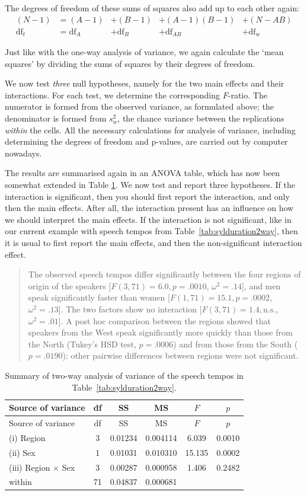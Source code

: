 \documentclass[
]{book}
\begin{document}
The degrees of freedom of these sums of squares also add up to each other
again:
\begin{align}
  \label{eq:dftotal2}
    { (N-1) } &= (A-1) &+ (B-1) &+ (A-1)(B-1) &+ (N-AB) \\
    \textrm{df}_t &= \textrm{df}_A &+ \textrm{df}_B &+ \textrm{df}_{AB} &+ \textrm{df}_w
\end{align}

Just like with the one-way analysis of variance, we again calculate the
`mean squares' by dividing the sums of squares by their degrees of freedom.

We now test \emph{three} null hypotheses, namely for the two main effects and their
interactions. For each test, we determine the corresponding
\(F\)-ratio. The numerator is formed from the observed variance,
as formulated above; the denominator is formed from \(s^2_w\), the
chance variance between the replications \emph{within} the cells. All
the necessary calculations for analysis of variance, including determining
the degrees of freedom and p-values, are carried out by computer
nowadays.

The results are summarised again in an ANOVA table, which has now been somewhat
extended in Table \ref{tab:syldur2way-anova}. We now test and report three
hypotheses. If the interaction is significant, then you should first report
the interaction, and only then the main effects. After all, the interaction present
has an influence on how we should interpret the main effects. If the interaction
is not significant, like in our current example with speech tempos from
Table~\ref{tab:sylduration2way}, then it is usual to first report the main
effects, and then the non-significant interaction effect.

\begin{quote}
The observed speech tempos differ significantly between the four
regions of origin of the speakers
{[}\(F(3,71)=6.0, p=.0010\), \(\omega^2=.14\){]}, and men speak significantly faster
than women {[}\(F(1,71)=15.1, p=.0002\), \(\omega^2=.13\){]}.
The two factors show no interaction
{[}\(F(3,71)=1.4, \textrm{n.s.}\), \(\omega^2=.01\){]}.
A post hoc comparison between the regions showed that speakers from
the West speak significantly more quickly than those from the North (Tukey's
HSD test, \(p=.0006\)) and from those from the South (\(p=.0190\)); other
pairwise differences between regions were not significant.
\end{quote}

\begin{longtable}[]{@{}lccccc@{}}
\caption{\label{tab:syldur2way-anova} Summary of two-way analysis of variance of the speech
tempos in Table~\ref{tab:sylduration2way}.}\tabularnewline
\toprule
Source of variance & df & SS & MS & \(F\) & \(p\)\tabularnewline
\midrule
\endfirsthead
\toprule
Source of variance & df & SS & MS & \(F\) & \(p\)\tabularnewline
\midrule
\endhead
(i) Region & 3 & 0.01234 & 0.004114 & 6.039 & 0.0010\tabularnewline
(ii) Sex & 1 & 0.01031 & 0.010310 & 15.135 & 0.0002\tabularnewline
(iii) Region \(\times\) Sex & 3 & 0.00287 & 0.000958 & 1.406 & 0.2482\tabularnewline
within & 71 & 0.04837 & 0.000681 & &\tabularnewline
\bottomrule
\end{longtable}
\end{document}
